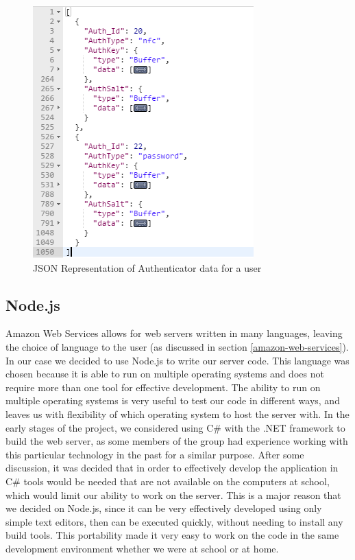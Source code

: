 \documentclass[12pt]{report}
\let\Oldsubsection\subsection
\renewcommand{\subsection}{\FloatBarrier\Oldsubsection}
\begin{document}
\begin{figure}
    \includegraphics[width=\textwidth]{Diagrams/Server_Diagrams/JSON}
    \caption{JSON Representation of Authenticator data for a user}
    \label{fig:json-authenticators}
\end{figure}

\subsection{Node.js} \label{node.js}

Amazon Web Services allows for web
servers written in many languages, leaving the choice of language to the user (as discussed in section \ref{amazon-web-services}).
In our case we
decided to use Node.js to write our server code. This language was chosen because it is able to
run on multiple operating systems and does not require more than one tool for effective development.
The ability to run on multiple operating systems is very useful to test our code in different ways,
and leaves us with flexibility of which operating system to host the server with. In the early
stages of the project, we considered using C\# with the .NET framework to build the web server,
as some members of the group had experience working with this particular technology in the past
for a similar purpose. After some discussion, it was decided that in order to effectively develop
the application in C\# tools would be needed that are not available on the computers at school,
which would limit our ability to work on the server. This is a major reason that we decided on
Node.js, since it can be very effectively developed using only simple text editors, then can be
executed quickly, without needing to install any build tools. This portability made it very easy to
work on the code in the same development environment whether we were at school or at home.
\end{document}
